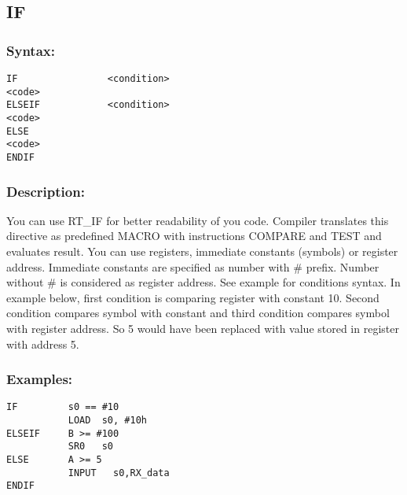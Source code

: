     \subsection{IF}
        \subsubsection{Syntax:}
            {
                \usecodefont
                \verb'IF                <condition>'\\
                \verb'<code>'\\
                \verb'ELSEIF            <condition>'\\
                \verb'<code>'\\
                \verb'ELSE'\\
                \verb'<code>'\\
                \verb'ENDIF'\\
            }

        \subsubsection{Description:}
            You can use RT\_IF for better readability of you code. Compiler translates this directive as predefined MACRO with instructions COMPARE and TEST and evaluates result. You can use registers, immediate constants (symbols) or register address. Immediate constants are specified as number with \# prefix. Number without \# is considered as register address. See example for conditions syntax. In example below, first condition is comparing register with constant 10. Second condition compares symbol with constant and third condition compares symbol with register address. So 5 would have been replaced with value stored in register with address 5.

        \subsubsection{Examples:}
            {
                \usecodefont
                \verb'IF         s0 == #10'\\
                \verb'           LOAD  s0, #10h'\\
                \verb'ELSEIF     B >= #100'\\
                \verb'           SR0   s0'\\
                \verb'ELSE       A >= 5'\\
                \verb'           INPUT   s0,RX_data'\\
                \verb'ENDIF'
            }


